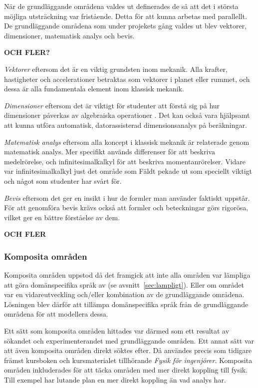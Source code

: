 \begin{binge}
När de grundläggande områdena valdes ut definerades de så att det i största möjliga
utsträckning var fristående. Detta för att kunna arbetas med parallellt. De
grundläggande områdena som under projekets gång valdes ut blev vektorer,
dimensioner, matematisk analys och bevis. 

\textbf{OCH FLER?}

\textit{Vektorer} eftersom det är en viktig grundsten inom mekanik. Alla krafter,
hastigheter och accelerationer betraktas som vektorer i planet eller
rummet, och dessa är alla fundamentala element inom klassisk mekanik.

\textit{Dimensioner} eftersom det är viktigt för studenter att förstå sig på
hur dimensioner påverkas av algebraiska operationer . Det kan också vara hjälpsamt att kunna utföra automatisk,
datorassisterad dimensionsanalys på beräkningar.

\textit{Matematisk analys} eftersom alla koncept i klassisk mekanik är
relaterade genom matematisk analys. Mer specifikt används differenser för att
beskriva medelrörelse, och infinitesimalkalkyl för att beskriva
momentanrörelser. Vidare var infinitesimalkalkyl just det område som Fäldt
pekade ut som speciellt viktigt och något som studenter har svårt för.

\textit{Bevis} eftersom det ger en insikt i hur de formler man använder
faktiskt uppstår. För att genomföra bevis krävs också att formler och
beteckningar görs rigorösa, vilket ger en bättre förståelse av dem.

\textbf{OCH FLER}
  
\subsubsection{Komposita områden}\label{sec:selektion_komposit}

Komposita områden uppstod då det framgick att inte alla områden var lämpliga
att göra domänspecifika språk av (se avsnitt~\ref{sec:lampligt}). Eller om
området var en vidareutveckling och/eller kombination av de grundläggande
områdena. Lösningen blev därför att tillämpa domänspecifika språk från de
grundläggande områdena för att modellera dessa.

Ett sätt som komposita områden hittades var därmed som ett resultat av sökandet och
experimenterandet med grundläggande områden. Ett annat sätt var att även
komposita områden direkt söktes efter. Då användes precis som tidigare främst
kursboken och kursmaterialet tillhörande \textit{Fysik för ingenjörer}.
Komposita områden inkluderades för att täcka områden med mer direkt koppling
till fysik. Till exempel har lutande plan en mer direkt koppling än vad analys
har.


\end{binge}
